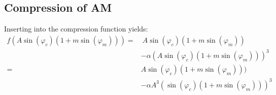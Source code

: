 \documentclass[12pt]{article}
\begin{document}
\subsection{Compression of AM}

Inserting into the compression function yields:
\begin{equation}
\begin{aligned}
f(A \sin(\varphi_c) \left( 1 + m \sin(\varphi_m) \right))   = & \ A \sin(\varphi_c) \left( 1 + m \sin(\varphi_m) \right) \\
          & - \alpha ( A \sin(\varphi_c) \left( 1 + m \sin(\varphi_m) \right) )^3 \\
          = & A \sin(\varphi_c) \left( 1 + m \sin(\varphi_m) \right)) \\
            & - \alpha A^3 ( \sin(\varphi_c) (1+ m \sin(\varphi_m) ) )^3 \\
\end{aligned}
\end{equation}
\end{document}

